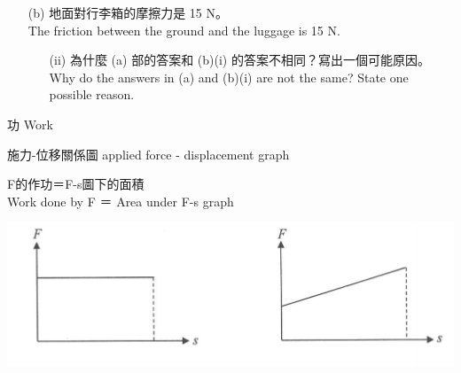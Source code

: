 \documentclass[beamer=true]{standalone}
\begin{document}
\begin{eg}
    \begin{itemize}
        \item [(b)] 地面對行李箱的摩擦力是 15 N。 \\The friction between the ground and the luggage is 15 N.
              \begin{itemize}
                  \item [(ii)] 為什麼 (a) 部的答案和 (b)(i) 的答案不相同？寫出一個可能原因。 \\Why do the answers in (a) and (b)(i) are not the same? State one possible reason.
              \end{itemize}
    \end{itemize}
\end{eg}

\begin{frame}{功 Work}
    \begin{exampleblock}
        {施力-位移關係圖  applied force - displacement graph}
        \begin{center}
            F的作功＝F-s圖下的面積\\Work done by F ＝ Area under F-s graph
        \end{center}
    \end{exampleblock}
    \bigskip
    {\par\centering
        \includegraphics[width=.7\textwidth]{assets/f964c556.png}
        \par}
\end{frame}
\end{document}
